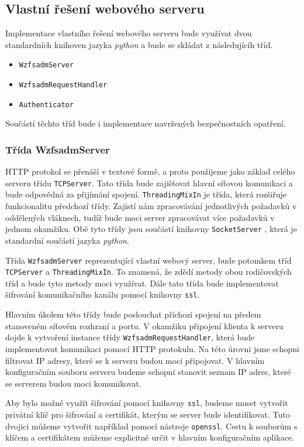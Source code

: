     \subsection{Vlastní řešení webového serveru}
    Implementace vlastního řešení webového serveru bude využívat dvou standardních knihoven jazyka \emph{python} a bude se skládat z následujícíh tříd.
    \begin{itemize}
      \item \verb|WzfsadmServer|
      \item \verb|WzfsadmRequestHandler|
      \item \verb|Authenticator|
    \end{itemize}

    Součástí těchto tříd bude i implementace navržených bezpečnostních opatření.
    \subsubsection{Třída WzfsadmServer}
    HTTP protokol se přenáší v textové formě, a proto použijeme jako základ celého serveru třídu \verb|TCPServer|. Tato třída bude zajišťovat hlavní síťovou komunikaci a bude odpovědná za přijímání spojení. \verb|ThreadingMixIn| je třída, která rozšiřuje funkcionalitu předchozí třídy. Zajistí nám zpracovávání jednotlivých požadavků v oddělených vláknech, tudíž bude moci server zpracovávat více požadavků v jednom okamžiku. Obě tyto třídy jsou součástí knihovny \verb|SocketServer| \cite{socketserver}, která je standardní součástí jazyka \emph{python}.

    Třída \verb|WzfsadmServer| reprezentující vlastní webový server, bude potomkem tříd \verb|TCPServer| a \verb|ThreadingMixIn|. To znamená, že zdědí metody obou rodičovských tříd a bude tyto metody moci využívat. Dále tato třída bude implementovat šifrování komunikačního kanálu pomocí knihovny \verb|ssl|.

    Hlavním úkolem této třídy bude poslouchat příchozí spojení na předem stanoveném síťovém rozhraní a portu. V okamžiku připojení klienta k serveru dojde k vytvoření instance třídy \verb|WzfsadmRequestHandler|, která bude implementovat komunikaci pomocí HTTP protokulu. Na této úrovni jsme schopni filtrovat IP adresy, které se k serveru budou moci připojovat. V hlavním konfiguračním souboru serveru budeme schopni stanovit seznam IP adres, které se serverem budou moci komunikovat.

    Aby bylo možné využít šifrování pomocí knihovny \verb|ssl|, budeme muset vytvořit privátní klíč pro šifrování a certifikát, kterým se server bude identifikovat. Tuto dvojici můžeme vytvořit například pomocí nástroje \verb|openssl|. Cestu k souborům s klíčem a certifikátem můžeme explicitně určit v hlavním konfiguračním aplikace.

